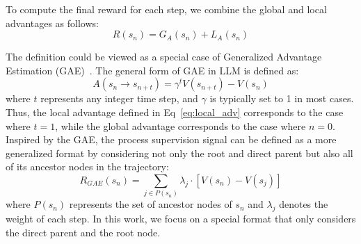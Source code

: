 To compute the final reward for each step, we combine the global and local advantages as follows:
\begin{equation}
R(s_n) = G_A(s_n) + L_A(s_n)
\label{eq:process_reward}
\end{equation}


The definition could be viewed as a special case of Generalized Advantage Estimation (GAE)~\cite{schulman2015high}. The general form of GAE in LLM is defined as:
\begin{equation}
    A(s_n \rightarrow s_{n+t}) = \gamma^t V(s_{n+t}) - V(s_n) 
\end{equation}
where $t$ represents any integer time step, and $\gamma$ is typically set to 1 in most cases. Thus, the local advantage defined in Eq~\ref{eq:local_adv} corresponds to the case where $t=1$, while the global advantage corresponds to the case where $n=0$. 
Inspired by the GAE, the process supervision signal can be defined as a more generalized format by considering not only the root and direct parent but also all of its ancestor nodes in the trajectory:
\[
R_{GAE}(s_n) = \sum_{j \in P(s_n)} \lambda_j \cdot [V(s_n) - V(s_j)]
\]
where \( P(s_n) \) represents the set of ancestor nodes of \( s_n \) and $\lambda_j$ denotes the weight of each step. In this work, we focus on a special format that only considers the direct parent and the root node. 


